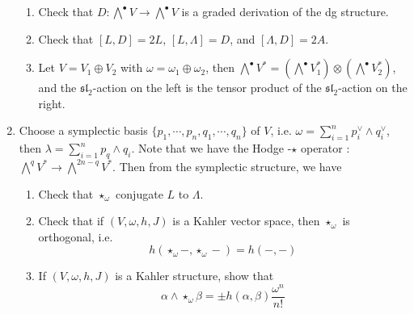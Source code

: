 \documentclass[
11pt, %
letterpaper， %
oneside, %
headinclude,footinclude, %
BCOR5mm, %
]{scrartcl}
\begin{document}
\begin{enumerate}
\begin{exercise}
		\begin{enumerate}
			\item Check that $D:\bigwedge^{\bullet}V \to \bigwedge^{\bullet}V$ is a graded derivation of the dg structure.
			\item Check that $[L,D]=2L$, $[L,\Lambda]=D$, and $[\Lambda, D]=2A$.
			\item Let $V=V_1\oplus V_2$ with $\omega=\omega_1\oplus \omega_2$, then $\bigwedge^{\bullet}V^*=(\bigwedge^{\bullet}V_1^*)\otimes (\bigwedge^{\bullet}V_2^*)$, and the $\mathfrak{sl}_2$-action on the left is the tensor product of the $\mathfrak{sl}_2$-action on the right.
		
		\end{enumerate}
	\end{exercise}

	\item  Choose a symplectic basis $\{p_1, \cdots, p_n, q_1, \cdots, q_n \}$ of $V$, i.e. $\omega=\sum_{i=1}^n p_i^{\vee}\wedge q_i^{\vee}$, then $\lambda=\sum_{i=1}^n p_q\wedge q_i$. Note that we have the Hodge -$\star$ operator : $\bigwedge^q V^{*} \to \bigwedge^{2n-q}V^*$. Then from the symplectic structure, we have
\begin{center}
\end{center}
    \begin{exercise}
    	\begin{enumerate}
    		\item Check that $\star_{\omega}$ conjugate $L$ to $\Lambda$.
    		\item Check that if $(V, \omega, h, J)$ is a Kahler vector space, then $\star_{\omega}$ is orthogonal, i.e.
    		\begin{equation*}
    		h(\star_{\omega}-, \star_{\omega}-)=h(-,-)
    		\end{equation*}
    		\item If $(V, \omega, h, J)$  is a Kahler structure, show that
    		\begin{equation*}
    		 \alpha\wedge \star_{\omega} \beta= \pm h(\alpha,\beta) \frac{\omega^n}{n !}
    		\end{equation*}
    	\end{enumerate}
    \end{exercise}
\end{enumerate}
\end{document}
